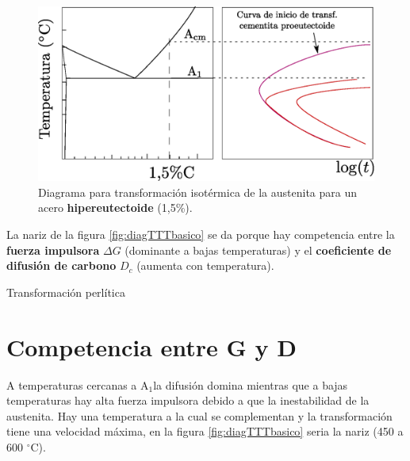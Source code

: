 \documentclass{article}
\newcommand{\Aone}{A\ensuremath{_{1}}}
\newcommand{\grad}{\ensuremath{^\circ \mathrm{C}}}
\begin{document}
\begin{figure}[htb!]
    \centering
    \includegraphics[width=\textwidth]{fig/diagTTThiper.eps}
    \caption{Diagrama para transformación isotérmica de la austenita para un acero \textbf{hipereutectoide} (1,5\%).}
    \label{fig:diagTTThiper}
\end{figure}

La nariz de la figura \ref{fig:diagTTTbasico} se da porque hay competencia entre la \textbf{fuerza impulsora} $\Delta G$ (dominante a bajas temperaturas) y el \textbf{coeficiente de difusión de carbono} $D_c$ (aumenta con temperatura).

Transformación perlítica



\section{Competencia entre G y D}
A temperaturas cercanas a \Aone la difusión domina mientras que a bajas temperaturas hay alta fuerza impulsora debido a que la inestabilidad de la austenita. Hay una temperatura a la cual se complementan y la transformación tiene una velocidad máxima, en la figura \ref{fig:diagTTTbasico} seria la nariz (450 a 600 \grad).
\end{document}
